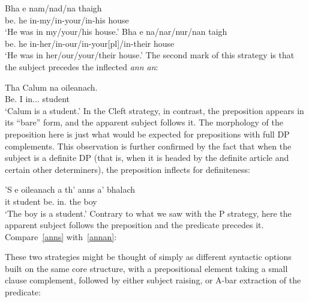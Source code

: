 \documentclass[output=paper]{langsci/langscibook}
\begin{document}
\ea {}
\sn
\gll Bha e nam/nad/na thaigh\\
be.\Pst{} he in-my/in-your/in-his house\\
\glt `He was in my/your/his house.'
\z
\ea {}
\sn
\gll Bha e na/nar/nur/nan taigh\\
be.\Pst{} he in-her/in-our/in-your[pl]/in-their house\\
\glt `He was in her/our/your/their house.'
\z
The second mark of this strategy is that the subject precedes the inflected
\emph{ann an}:\largerpage

\ea {}
\sn
\gll Tha  Calum  na  oileanach.\\
Be.\Prs{}  I  in.\Poss.\Tsg.\M{}  student \\
\glt \enquote*{Calum is a student.}
\z
\ea {}
\z
In the Cleft strategy, in contrast, the preposition appears in its ``bare''
form, and the apparent subject follows it. The morphology of the preposition
here is just what would be expected for prepositions with full DP complements.
This observation is further confirmed by the fact that when the subject is a
definite DP (that is, when it is headed by the definite article and certain
other determiners), the preposition inflects for definiteness:

\ea {} \label{anns}
\sn
\gll 'S e oileanach a th' anns a' bhalach\\
\Cop{} it student \Rel{} be.\Prs{} in.\Def{} the  boy\\
\glt \enquote*{The boy is a student.}
\z
Contrary to what we saw with the P strategy, here the apparent subject follows
the preposition and the predicate precedes it. Compare~\eqref{anns}
with~\eqref{annan}:

\ea {}
    \label{annan}
\z
These two strategies might be thought of simply as different syntactic options
built on the same core structure, with a prepositional element taking a small
clause complement, followed by either subject raising, or A-bar extraction of
the predicate:
\end{document}
